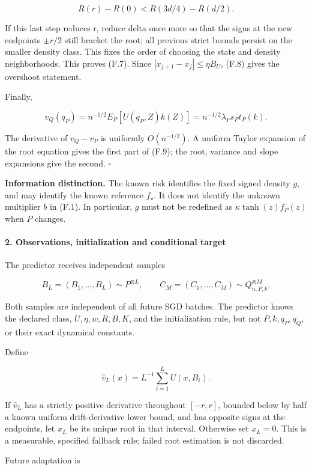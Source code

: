 \[
R(r)-R(0)<R(3d/4)-R(d/2).
\]

If this last step reduces r, reduce delta once more so that the signs at
the new endpoints \(\pm r/2\) still bracket the root; all previous
strict bounds persist on the smaller density class. This fixes the order
of choosing the state and density neighborhoods. This proves (F.7).
Since \(|x_{j+1}-x_j|\le\eta B_U\), (F.8) gives the overshoot statement.

Finally,

\[
v_Q(q_P)=n^{-1/2}E_P[U(q_P,Z)k(Z)]
        =n^{-1/2}\lambda_Ps_Pt_P(k).
\]

The derivative of \(v_Q-v_P\) is uniformly \(O(n^{-1/2})\). A uniform
Taylor expansion of the root equation gives the first part of (F.9); the
root, variance and slope expansions give the second. \(\square\)

\textbf{Information distinction.} The known risk identifies the fixed
signed density \(g\), and may identify the known reference \(f_\star\).
It does not identify the unknown multiplier \(b\) in (F.1). In
particular, \(g\) must not be redefined as \(\kappa\tanh(z)f_P(z)\) when
\(P\) changes.

\paragraph{2. Observations, initialization and conditional
target}\label{observations-initialization-and-conditional-target}

The predictor receives independent samples

\[
B_L=(B_1,\ldots,B_L)\sim P^{\otimes L},\qquad
C_M=(C_1,\ldots,C_M)\sim Q_{n,P,k}^{\otimes M}.
\tag{F.10}
\]

Both samples are independent of all future SGD batches. The predictor
knows the declared class, \(U,\eta,w,R,B,K\), and the initialization
rule, but not \(P,k,q_P,q_Q\), or their exact dynamical constants.

Define

\[
\widehat v_L(x)=L^{-1}\sum_{i=1}^{L}U(x,B_i).
\]

If \(\widehat v_L\) has a strictly positive derivative throughout
\([-r,r]\), bounded below by half a known uniform drift-derivative lower
bound, and has opposite signs at the endpoints, let \(x_L\) be its
unique root in that interval. Otherwise set \(x_L=0\). This is a
measurable, specified fallback rule; failed root estimation is not
discarded.

Future adaptation is

